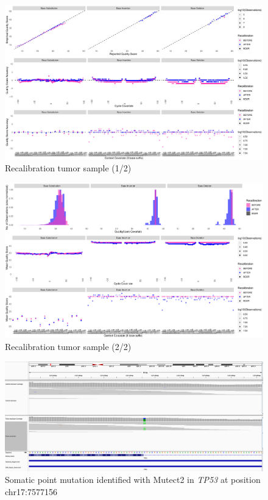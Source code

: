\documentclass[11pt]{article}
\begin{document}
\begin{figure}[h]
   \centering
   \includegraphics[width=\textwidth]{images/recal_tumor_1_setup1.png}
   \caption{\footnotesize{Recalibration tumor sample (1/2)}}
   \label{recal_tumor_1}
\end{figure}

\begin{figure}[h]
   \centering
   \includegraphics[width=\textwidth]{images/recal_tumor_2_setup1.png}
   \caption{\footnotesize{Recalibration tumor sample (2/2)}}
   \label{recal_tumor_2}
\end{figure}

\begin{figure}[h]
   \centering
   \includegraphics[width=\textwidth]{images/somatic_p53_pm.png}
   \caption{\footnotesize{Somatic point mutation identified with Mutect2 in \emph{TP53} at position chr17:7577156}}
   \label{pm_p53}
\end{figure}
\end{document}

